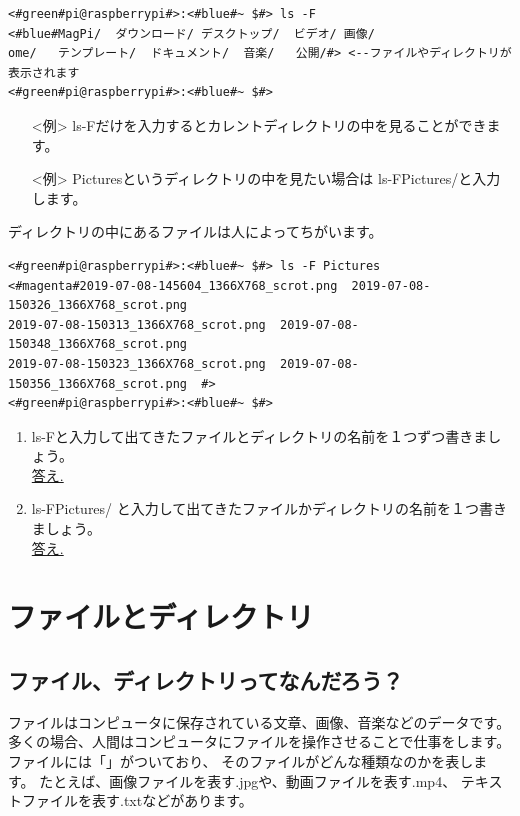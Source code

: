 \begin{lstlisting}[caption=ls -F コマンドの例,label=lsFtest]
<#green#pi@raspberrypi#>:<#blue#~ $#> ls -F
<#blue#MagPi/  ダウンロード/ デスクトップ/  ビデオ/ 画像/
ome/   テンプレート/  ドキュメント/  音楽/   公開/#> <--ファイルやディレクトリが表示されます
<#green#pi@raspberrypi#>:<#blue#~ $#>
\end{lstlisting}

\begin{itemize}
\item[<例>] ls\textvisiblespace -Fだけを入力するとカレントディレクトリの中を見ることができます。 
\item[<例>] Picturesというディレクトリの中を見たい場合は ls\textvisiblespace -F\textvisiblespace Pictures/と入力します。 
\end{itemize}

ディレクトリの中にあるファイルは人によってちがいます。
\begin{lstlisting}[caption=ls -F Pictures/コマンドの例,label=lsFPicttest]
<#green#pi@raspberrypi#>:<#blue#~ $#> ls -F Pictures
<#magenta#2019-07-08-145604_1366X768_scrot.png  2019-07-08-150326_1366X768_scrot.png  
2019-07-08-150313_1366X768_scrot.png  2019-07-08-150348_1366X768_scrot.png  
2019-07-08-150323_1366X768_scrot.png  2019-07-08-150356_1366X768_scrot.png  #>
<#green#pi@raspberrypi#>:<#blue#~ $#> 
\end{lstlisting}

\begin{tcolorbox}[title=\useOmetoi]
\begin{enumerate}
\item ls\textvisiblespace -Fと入力して出てきたファイルとディレクトリの名前を１つずつ書きましょう。\\
\underline{答え.\hspace{0.8\linewidth}}
\item ls\textvisiblespace -F\textvisiblespace Pictures/ と入力して出てきたファイルかディレクトリの名前を１つ書きましょう。\\
\underline{答え.\hspace{0.8\linewidth}}
\end{enumerate}
\end{tcolorbox}




\section{ファイルとディレクトリ}
\subsection{ファイル、ディレクトリってなんだろう？}
ファイルはコンピュータに保存されている文章、画像、音楽などのデータです。
多くの場合、人間はコンピュータにファイルを操作させることで仕事をします。
ファイルには「」がついており、
そのファイルがどんな種類なのかを表します。
たとえば、画像ファイルを表す.jpgや、動画ファイルを表す.mp4、
テキストファイルを表す.txtなどがあります。


